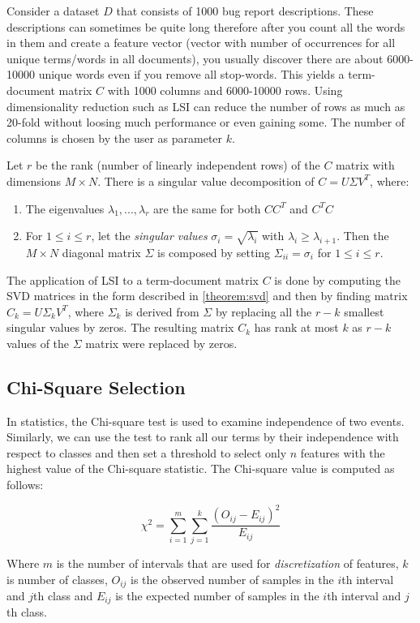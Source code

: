 Consider a dataset $D$ that consists of 1000 bug report descriptions. These descriptions can sometimes be quite long therefore after you count all the words in them and create a feature vector (vector with number of occurrences for all unique terms/words in all documents), you usually discover there are about 6000-10000 unique words even if you remove all stop-words. This yields a term-document matrix $C$ with 1000 columns and 6000-10000 rows. Using dimensionality reduction such as LSI can reduce the number of rows as much as 20-fold without loosing much performance or even gaining some. The number of columns is chosen by the user as parameter $k$.

\begin{theorem}
\label{theorem:svd}
Let $r$ be the rank (number of linearly independent rows) of the $C$ matrix with dimensions $M \times N$. There is a singular value decomposition of $C = U \Sigma V^T$, where:
\begin{enumerate}
    \item The eigenvalues $\lambda_1,...,\lambda_r$ are the same for both $CC^T$ and $C^TC$
    \item For $1 \leq i \leq r$, let the \textit{singular values} $\sigma_i = \sqrt{\lambda_i}$ with $\lambda_i \geq \lambda_{i+1}$. Then the $M \times N$ diagonal matrix $\Sigma$ is composed by setting $\Sigma_{ii} = \sigma_i$ for $1 \leq i \leq r$.
\end{enumerate}
\end{theorem}

The application of LSI to a term-document matrix $C$ is done by computing the SVD matrices in the form described in \autoref{theorem:svd} and then by finding matrix $C_k = U \Sigma_k V^T$, where $\Sigma_k$ is derived from $\Sigma$ by replacing all the $r-k$ smallest singular values by zeros. The resulting matrix $C_k$ has rank at most $k$ as $r-k$ values of the $\Sigma$ matrix were replaced by zeros.

\subsection{Chi-Square Selection}

In statistics, the Chi-square test is used to examine independence of two events. Similarly, we can use the test to rank all our terms by their independence with respect to classes and then set a threshold to select only $n$ features with the highest value of the Chi-square statistic. The Chi-square value is computed as follows:

$$\chi^2 = \sum_{i=1}^m \sum_{j=1}^k \frac{(O_{ij} - E_{ij})^2}{E_{ij}}$$

Where $m$ is the number of intervals that are used for \textit{discretization} of features, $k$ is number of classes, $O_{ij}$ is the observed number of samples in the $i$th interval and $j$th class and $E_{ij}$ is the expected number of samples in the $i$th interval and $j$th class.